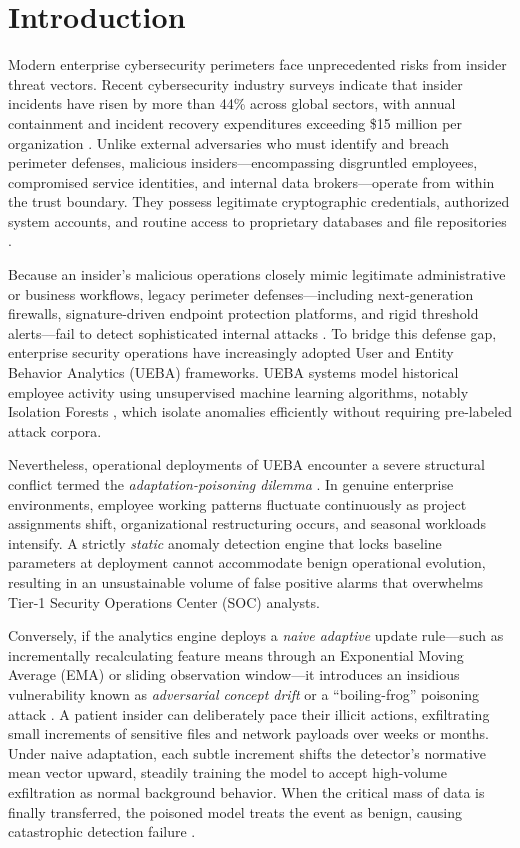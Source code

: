 \documentclass[conference]{IEEEtran}
\begin{document}
\section{Introduction}
Modern enterprise cybersecurity perimeters face unprecedented risks from insider threat vectors. Recent cybersecurity industry surveys indicate that insider incidents have risen by more than 44\% across global sectors, with annual containment and incident recovery expenditures exceeding \$15 million per organization \cite{b1}. Unlike external adversaries who must identify and breach perimeter defenses, malicious insiders---encompassing disgruntled employees, compromised service identities, and internal data brokers---operate from within the trust boundary. They possess legitimate cryptographic credentials, authorized system accounts, and routine access to proprietary databases and file repositories \cite{b2}.

Because an insider's malicious operations closely mimic legitimate administrative or business workflows, legacy perimeter defenses---including next-generation firewalls, signature-driven endpoint protection platforms, and rigid threshold alerts---fail to detect sophisticated internal attacks \cite{b2}. To bridge this defense gap, enterprise security operations have increasingly adopted User and Entity Behavior Analytics (UEBA) frameworks. UEBA systems model historical employee activity using unsupervised machine learning algorithms, notably Isolation Forests \cite{b4}, which isolate anomalies efficiently without requiring pre-labeled attack corpora.

Nevertheless, operational deployments of UEBA encounter a severe structural conflict termed the \textit{adaptation-poisoning dilemma} \cite{b5}. In genuine enterprise environments, employee working patterns fluctuate continuously as project assignments shift, organizational restructuring occurs, and seasonal workloads intensify. A strictly \textit{static} anomaly detection engine that locks baseline parameters at deployment cannot accommodate benign operational evolution, resulting in an unsustainable volume of false positive alarms that overwhelms Tier-1 Security Operations Center (SOC) analysts.

Conversely, if the analytics engine deploys a \textit{naive adaptive} update rule---such as incrementally recalculating feature means through an Exponential Moving Average (EMA) or sliding observation window---it introduces an insidious vulnerability known as \textit{adversarial concept drift} or a ``boiling-frog'' poisoning attack \cite{b6}. A patient insider can deliberately pace their illicit actions, exfiltrating small increments of sensitive files and network payloads over weeks or months. Under naive adaptation, each subtle increment shifts the detector's normative mean vector upward, steadily training the model to accept high-volume exfiltration as normal background behavior. When the critical mass of data is finally transferred, the poisoned model treats the event as benign, causing catastrophic detection failure \cite{b8}.
\end{document}
